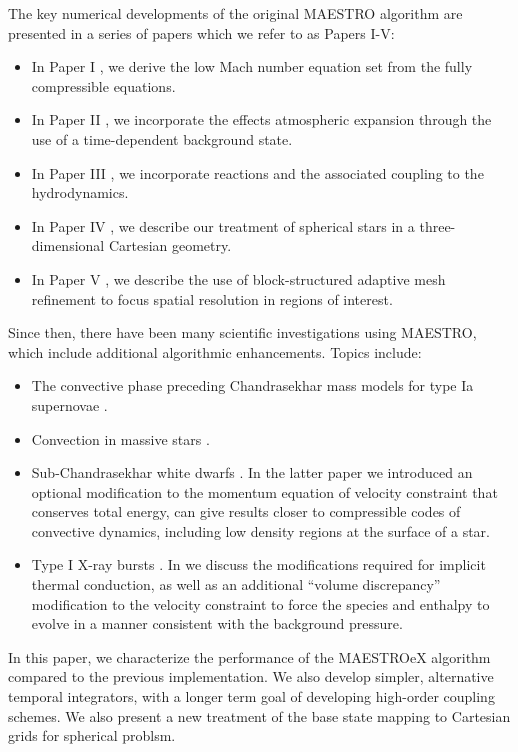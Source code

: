 The key numerical developments of the original MAESTRO algorithm are presented in a series of papers which we refer to as Papers I-V:
\begin{itemize}
\item In Paper I \citep{MAESTRO_I}, we derive the low Mach number equation set from the fully compressible equations.
\item In Paper II \citep{MAESTRO_II}, we incorporate the effects atmospheric expansion through the use of a time-dependent background state.
\item In Paper III \citep{MAESTRO_III}, we incorporate reactions and the associated coupling to the hydrodynamics.
\item In Paper IV \citep{MAESTRO_IV}, we describe our treatment of spherical stars in a three-dimensional Cartesian geometry.
\item In Paper V \citep{MAESTRO_V}, we describe the use of block-structured adaptive mesh refinement to focus spatial resolution in regions of interest.
\end{itemize} 

Since then, there have been many scientific investigations using MAESTRO, which include additional algorithmic enhancements.  Topics include:
\begin{itemize}
\item The convective phase preceding Chandrasekhar mass models for type Ia supernovae \citep{MAESTRO_convection,MAESTRO_AMR,MAESTRO_CASTRO}.
\item Convection in massive stars \citep{Gilet:2013}.
\item Sub-Chandrasekhar white dwarfs \citep{subChandra_I,subChandra_II}.  In the latter paper we introduced an optional modification to the momentum equation of velocity constraint that conserves total energy, can give results closer to compressible codes of convective dynamics, including low density regions at the surface of a star.
\item Type I X-ray bursts \citep{XRB_I,XRB_II,XRB_III}.  In \cite{XRB_I} we discuss the modifications required for implicit thermal conduction, as well as an additional ``volume discrepancy'' modification to the velocity constraint to force the species and enthalpy to evolve in a manner consistent with the background pressure.
\end{itemize}

In this paper, we characterize the performance of the MAESTROeX algorithm compared to the previous implementation.
We also develop simpler, alternative temporal integrators, with a longer term goal of developing high-order coupling schemes.
We also present a new treatment of the base state mapping to Cartesian grids for spherical problsm.
